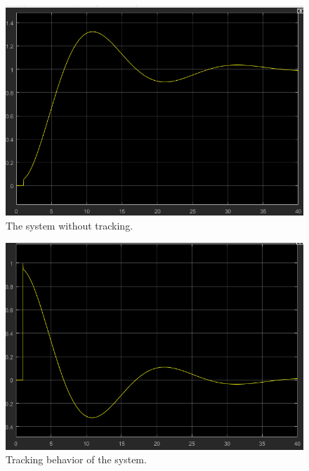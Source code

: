 \begin{figure}[h!]
    \centering
    \includegraphics[width=\linewidth]{images/slope.png}
    \caption{The system without tracking.}
    \label{fig:WithoutTracking}
\end{figure}

\begin{figure}[h!]
    \centering
    \includegraphics[width=\linewidth]{images/slope_tracking.png}
    \caption{Tracking behavior of the system.}
    \label{fig:tracking}
\end{figure}

